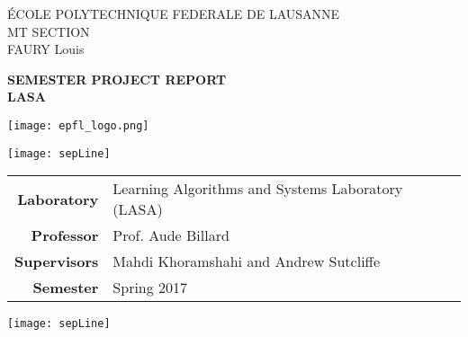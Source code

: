 





\begin{titlepage}
        	{\sffamily
	\large
        		\noindent \'ECOLE POLYTECHNIQUE FEDERALE DE LAUSANNE \\
        		MT SECTION\\
        		FAURY Louis \\
        	}
	
	\vfill 
        \begin{center}
   		{\sffamily\Huge
         		\textbf{SEMESTER PROJECT REPORT} \\
			\vspace{0.3cm}
			\Large
			\textbf{LASA}
		}
		\vspace{1cm}
	
        		\texttt{[image: epfl\_logo.png]}
        
        		\vspace{1cm}
         
         	\sffamily\huge\textbf{ 	
 }
        \end{center}
        
	\vspace{2cm}
         \centering\texttt{[image: sepLine]}
         \vspace{0.2cm}

	\large
        \begin{center}
		\begin{tabular}{rl}
    			\textbf{Laboratory} & Learning Algorithms and Systems Laboratory (LASA)\\
			\textbf{Professor} & Prof. Aude Billard \\
    			\textbf{Supervisors} & Mahdi Khoramshahi and Andrew Sutcliffe\\
			\textbf{Semester} & Spring 2017\\
		\end{tabular}
	\end{center}
	\vspace{0.05cm}
         \centering\texttt{[image: sepLine]}
         \vspace{0.6cm}
         \vfill
\end{titlepage}
